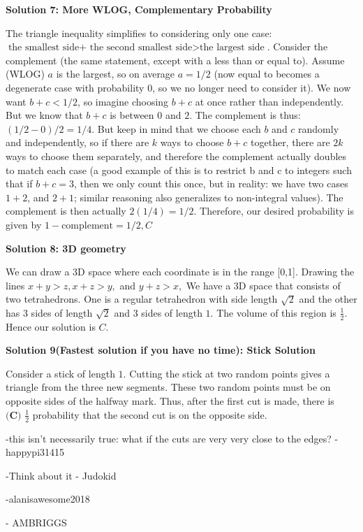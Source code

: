 \begin{enumerate}
\textbf{Solution 7: More WLOG, Complementary Probability}

The triangle inequality simplifies to considering only one case: $\text{the smallest side+ the second smallest side} > \text{the largest side}$. Consider the complement (the same statement, except with a less than or equal to).  Assume (WLOG) $a$ is the largest, so on average $a=1/2$ (now equal to becomes a degenerate case with probability $0$, so we no longer need to consider it). We now want $b+c<1/2$, so imagine choosing $b+c$ at once rather than independently. But we know that $b+c$ is between $0$ and $2$. The complement is thus: $(1/2-0)/2=1/4$. But keep in mind that we choose each $b$ and $c$ randomly and independently, so if there are $k$ ways to choose $b+c$ together, there are $2k$ ways to choose them separately, and therefore the complement actually doubles to match each case (a good example of this is to restrict b and c to integers such that if $b+c=3$, then we only count this once, but in reality: we have two cases $1+2$, and $2+1$; similar reasoning also generalizes to non-integral values). The complement is then actually $2(1/4)=1/2$. Therefore, our desired probability is given by $1-\text{complement}=1/2, C$




\textbf{Solution 8: 3D geometry}

We can draw a 3D space where each coordinate is in the range [0,1]. Drawing the lines $x+y>z, x+z>y,$ and $y+z>x,$ We have a 3D space that consists of two tetrahedrons. One is a regular tetrahedron with side length $\sqrt2$ and the other has 3 sides of length $\sqrt2$ and 3 sides of length $1.$ The volume of this region is $\frac 1 2$. Hence our solution is $C.$




\textbf{Solution 9(Fastest solution if you have no time): Stick Solution}

Consider a stick of length $1$. Cutting the stick at two random points gives a triangle from the three new segments. These two random points must be on opposite sides of the halfway mark. Thus, after the first cut is made, there is $\boxed{\textbf{(C) }\frac12}$ probability that the second cut is on the opposite side.

 -this isn't necessarily true: what if the cuts are very very close to the edges? -happypi31415

 -Think about it - Judokid

 -alanisawesome2018

 - AMBRIGGS


\end{enumerate}

